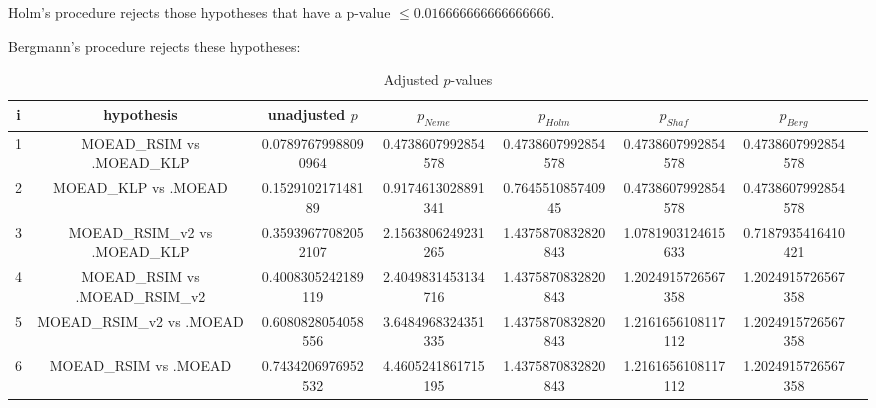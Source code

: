 \documentclass[a4paper,10pt]{article}
\begin{document}
\begin{landscape}
Holm's procedure rejects those hypotheses that have a p-value $\le0.016666666666666666$.


Bergmann's procedure rejects these hypotheses:


\begin{itemize}


\end{itemize}


\begin{table}[!htp]
\centering\tiny
\caption{Adjusted $p$-values}
\begin{tabular}{cccccccc}
i&hypothesis&unadjusted $p$&$p_{Neme}$&$p_{Holm}$&$p_{Shaf}$&$p_{Berg}$\\
\hline
1&MOEAD_RSIM vs .MOEAD_KLP&0.07897679988090964&0.4738607992854578&0.4738607992854578&0.4738607992854578&0.4738607992854578\\
2&MOEAD_KLP vs .MOEAD&0.152910217148189&0.9174613028891341&0.764551085740945&0.4738607992854578&0.4738607992854578\\
3&MOEAD_RSIM_v2 vs .MOEAD_KLP&0.35939677082052107&2.1563806249231265&1.4375870832820843&1.0781903124615633&0.7187935416410421\\
4&MOEAD_RSIM vs .MOEAD_RSIM_v2&0.4008305242189119&2.4049831453134716&1.4375870832820843&1.2024915726567358&1.2024915726567358\\
5&MOEAD_RSIM_v2 vs .MOEAD&0.6080828054058556&3.6484968324351335&1.4375870832820843&1.2161656108117112&1.2024915726567358\\
6&MOEAD_RSIM vs .MOEAD&0.7434206976952532&4.4605241861715195&1.4375870832820843&1.2161656108117112&1.2024915726567358\\
\hline
\end{tabular}
\end{table}

\end{landscape}
\end{document}
